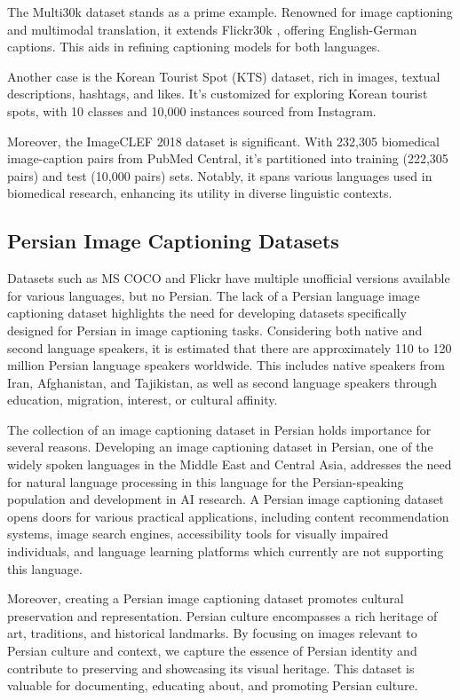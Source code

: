 \documentclass[lettersize,journal]{IEEEtran}
\begin{document}
The Multi30k dataset \cite{Multi30k} stands as a prime example. Renowned for image captioning and multimodal translation, it extends Flickr30k \cite{Flickr30k}, offering English-German captions. This aids in refining captioning models for both languages.

Another case is the Korean Tourist Spot (KTS) \cite{Korean} dataset, rich in images, textual descriptions, hashtags, and likes. It's customized for exploring Korean tourist spots, with 10 classes and 10,000 instances sourced from Instagram.

Moreover, the ImageCLEF 2018 \cite{ImageCLEF2018} dataset is significant. With 232,305 biomedical image-caption pairs from PubMed Central, it's partitioned into training (222,305 pairs) and test (10,000 pairs) sets. Notably, it spans various languages used in biomedical research, enhancing its utility in diverse linguistic contexts.


\subsection{Persian Image Captioning Datasets}
Datasets such as MS COCO and Flickr have multiple unofficial versions available for various languages, but no Persian. The lack of a Persian language image captioning dataset highlights the need for developing datasets specifically designed for Persian in image captioning tasks. Considering both native and second language speakers, it is estimated that there are approximately 110 to 120 million Persian language speakers worldwide. This includes native speakers from Iran, Afghanistan, and Tajikistan, as well as second language speakers through education, migration, interest, or cultural affinity.

The collection of an image captioning dataset in Persian holds importance for several reasons. Developing an image captioning dataset in Persian, one of the widely spoken languages in the Middle East and Central Asia, addresses the need for natural language processing in this language for the Persian-speaking population and development in AI research. A Persian image captioning dataset opens doors for various practical applications, including content recommendation systems, image search engines, accessibility tools for visually impaired individuals, and language learning platforms which currently are not supporting this language.

Moreover, creating a Persian image captioning dataset promotes cultural preservation and representation. Persian culture encompasses a rich heritage of art, traditions, and historical landmarks. By focusing on images relevant to Persian culture and context, we capture the essence of Persian identity and contribute to preserving and showcasing its visual heritage. This dataset is valuable for documenting, educating about, and promoting Persian culture.
\end{document}
